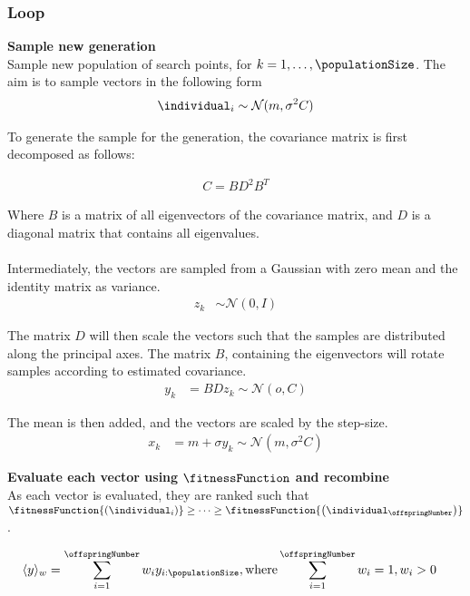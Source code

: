 \subsubsection{Loop}

\textbf{Sample new generation}\\
Sample new population of search points, for $k = 1, \dots, \populationSize$.
The aim is to sample vectors in the following form
\begin{align*}
\individual_{i} \sim \mathcal{N}(m, \sigma^2 C)
\end{align*}


To generate the sample for the generation, the covariance matrix is first 
decomposed as follows:

\begin{align*}
C = B D^2 B^{T}
\end{align*}

Where $B$ is a matrix of all eigenvectors of the covariance matrix, and  $D$
is a diagonal matrix that contains all eigenvalues.\\
\\
Intermediately, the vectors are sampled from a Gaussian with zero mean and
the identity matrix as variance.
\begin{align*}
z_{k} &\sim \mathcal{N}(0, I)
\end{align*}

The matrix $D$ will then scale the vectors such that the samples
are distributed along the principal axes. The matrix $B$, containing 
the eigenvectors will rotate samples according to estimated covariance.
\begin{align*}
y_{k} &= BDz_{k} \sim \mathcal{N}(o, C)
\end{align*}

The mean is then added, and the vectors are scaled by the step-size.
\begin{align*}
x_{k} &= m + \sigma y_{k} \sim \mathcal{N}(m, \sigma^2 C)
\end{align*}



\textbf{Evaluate each vector using $\fitnessFunction$ and recombine}\\
As each vector is evaluated, they are ranked such that 
$\fitnessFunction{ \left( \individual_{i} \right) } \geq \dots \geq \fitnessFunction{ \left( \individual_{\offspringNumber} \right)}$.

\begin{align*}
\langle y \rangle_{w} &= \sum^{\offspringNumber}_{i = 1}w_{i} y_{i : \populationSize}, \text{where} \sum^{\offspringNumber}_{i = 1} w_{i} = 1, w_{i} > 0
\end{align*}

